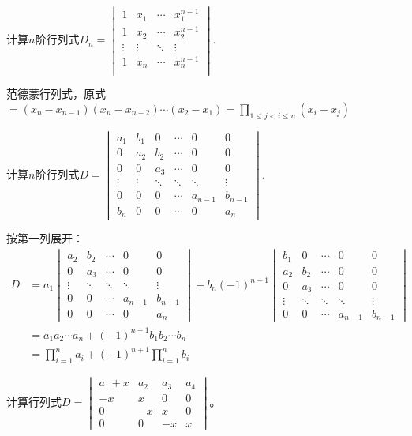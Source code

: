 \documentclass[a4paper]{report}
\begin{document}
\EX 计算$n$阶行列式$
D_{n}=
\begin{vmatrix}
1&x_1&\cdots&x_1^{n-1}\\
1&x_2&\cdots&x_2^{n-1}\\
\vdots&\vdots&\ddots&\vdots\\
1&x_n&\cdots&x_n^{n-1}\\
\end{vmatrix}
$.

\begin{jie}
范德蒙行列式，原式$=
(x_{n}-x_{n-1})(x_{n}-x_{n-2})\cdots(x_{2}-x_{1})=\prod\limits_{1\leq j<i\leq n}(x_i-x_j)
$
\end{jie}

\EX 计算$n$阶行列式$D=
\begin{vmatrix}
a_1&b_1&0&\cdots&0&0\\
0&a_2&b_2&\cdots&0&0\\
0&0&a_3&\cdots&0&0\\
\vdots&\vdots&\ddots&\ddots&\ddots&\vdots\\
0&0&0&\cdots&a_{n-1}&b_{n-1}\\
b_{n}&0&0&\cdots&0&a_n
\end{vmatrix}
$.

\begin{jie}
按第一列展开：
\begin{align*}
D&=a_{1}
\begin{vmatrix}
a_2&b_2&\cdots&0&0\\
0&a_3&\cdots&0&0\\
\vdots&\ddots&\ddots&\ddots&\vdots\\
0&0&\cdots&a_{n-1}&b_{n-1}\\
0&0&\cdots&0&a_n
\end{vmatrix}+b_{n}(-1)^{n+1}
\begin{vmatrix}
b_1&0&\cdots&0&0\\
a_2&b_2&\cdots&0&0\\
0&a_3&\cdots&0&0\\
\vdots&\ddots&\ddots&\ddots&\vdots\\
0&0&\cdots&a_{n-1}&b_{n-1}
\end{vmatrix}\\
&=a_1a_2\cdots a_{n}+(-1)^{n+1}b_1b_2\cdots b_n\\
&=\prod_{i=1}^{n}a_i+(-1)^{n+1}\prod_{i=1}^{n}b_i
\end{align*}
\end{jie}

\EX 计算行列式$
D=\begin{vmatrix}
a_1+x&a_2&a_3&a_4\\
-x&x&0&0\\
0&-x&x&0\\
0&0&-x&x
  \end{vmatrix}
$。
\end{document}
